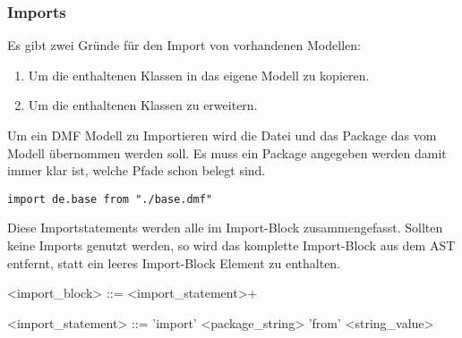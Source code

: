\documentclass[./einleitung.tex]{subfiles}
\begin{document}
\subsubsection{Imports}
Es gibt zwei Gründe für den Import von vorhandenen Modellen:
\begin{enumerate}
\item Um die enthaltenen Klassen in das eigene Modell zu kopieren.
\item Um die enthaltenen Klassen zu erweitern.
\end{enumerate}
Um ein DMF Modell zu Importieren wird die Datei und das Package das vom Modell übernommen werden soll. Es muss ein Package angegeben werden damit immer klar ist, welche Pfade schon belegt sind.
\begin{lstlisting}[caption={Import des Package de.base}]
import de.base from "./base.dmf"
\end{lstlisting}
Diese Importstatements werden alle im Import-Block zusammengefasst. Sollten keine Imports genutzt werden, so wird das komplette Import-Block aus dem AST entfernt, statt ein leeres Import-Block Element zu enthalten.
\begin{grammar}
<import_block> ::= <import_statement>+

<import_statement> ::= 'import' <package_string> 'from' <string_value>
\end{grammar}
\end{document}
